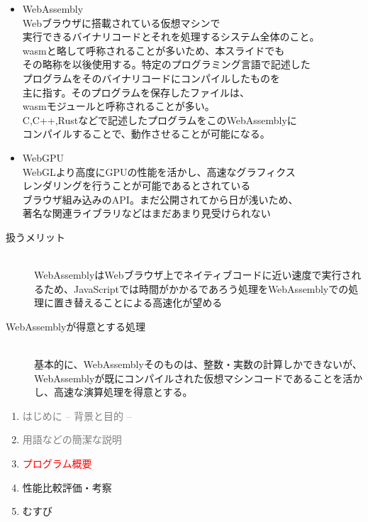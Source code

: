\begin{itemize}
	\item WebAssembly\\Webブラウザに搭載されている仮想マシンで\\実行できるバイナリコードとそれを処理するシステム全体\cite{WebAssembly}のこと。\\wasmと略して呼称されることが多いため、本スライドでも\\その略称を以後使用する。特定のプログラミング言語で記述した\\プログラムをそのバイナリコードにコンパイルしたものを\\主に指す。そのプログラムを保存したファイルは、\\wasmモジュールと呼称されることが多い。\\C,C++,Rustなどで記述したプログラムをこのWebAssemblyに\\コンパイルすることで、動作させることが可能になる。\cite{FromCompileLang}
	\newpage
	
	
	\item WebGPU\\WebGLより高度にGPUの性能を活かし、高速なグラフィクス\\レンダリングを行うことが可能であるとされている\\ブラウザ組み込みのAPI。まだ公開されてから日が浅いため、\\著名な関連ライブラリなどはまだあまり見受けられない
\end{itemize}
\newpage

\begin{description}
	\item[扱うメリット]~\\
	WebAssemblyはWebブラウザ上でネイティブコードに近い速度で実行される\cite{WasmLikeNativeSpeed}ため、JavaScriptでは時間がかかるであろう処理をWebAssemblyでの処理に置き替えることによる高速化が望める
	\item[WebAssemblyが得意とする処理]~\\
	基本的に、WebAssemblyそのものは、整数・実数の計算しかできない\cite{WasmOnlyCalc}が、WebAssemblyが既にコンパイルされた仮想マシンコードであることを活かし、高速な演算処理を得意とする。	
\end{description}
\newpage
\begin{enumerate}[itemsep=0.25\zh]
	\item \textcolor{gray}{はじめに -- 背景と目的 --}
	\item \textcolor{gray}{用語などの簡潔な説明}
	\item \textcolor{red}{プログラム概要}
	\item 性能比較評価・考察
	\item むすび
\end{enumerate}
\newpage

